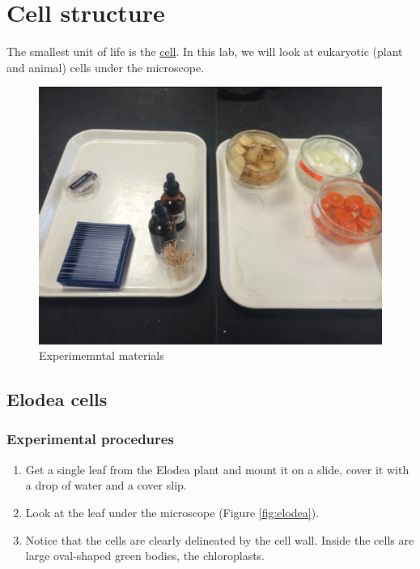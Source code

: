\chapter{Cell structure}\label{cell-structure}

The smallest unit of life is the
\href{https://en.wikipedia.org/wiki/Cell_(biology)}{cell}. In this lab,
we will look at eukaryotic (plant and animal) cells under the
microscope.

\begin{figure}

{\centering \includegraphics[width=0.7\linewidth]{./figures/cell_struc/materials}

}

\caption{Experimemntal materials}\label{fig:materials}
\end{figure}

\section{Elodea cells}\label{elodea-cells}

\subsection{Experimental procedures}\label{experimental-procedures-7}

\begin{enumerate}
\def\labelenumi{\arabic{enumi}.}
\tightlist
\item
  Get a single leaf from the Elodea plant and mount it on a slide, cover
  it with a drop of water and a cover slip.
\item
  Look at the leaf under the microscope (Figure \ref{fig:elodea}).
\item
  Notice that the cells are clearly delineated by the cell wall. Inside
  the cells are large oval-shaped green bodies, the chloroplasts.
\end{enumerate}

